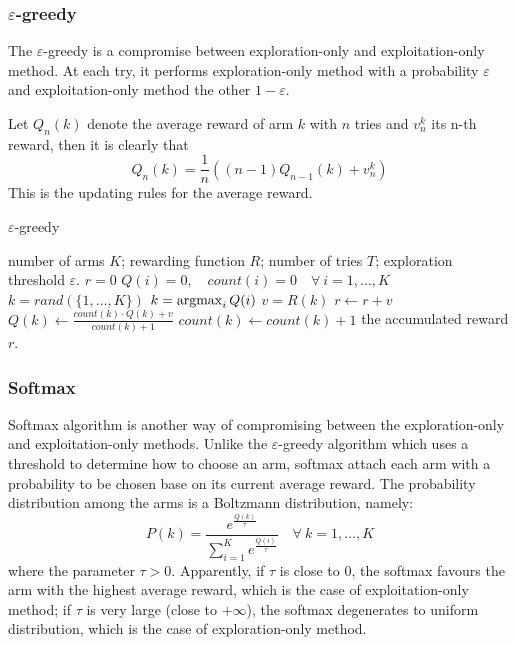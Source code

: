 \subsubsection{$\varepsilon$-greedy}
The $\varepsilon$-greedy is a compromise between exploration-only and exploitation-only method. At
each try, it performs exploration-only method with a probability $\varepsilon$ and exploitation-only method
the other $1 - \varepsilon$.\par
Let $Q_n(k)$ denote the average reward of arm $k$ with $n$ tries and $v_n^k$ its n-th reward, then it is 
clearly that
$$Q_n(k) = \frac{1}{n} ((n-1)Q_{n-1}(k) + v_n^k)$$
This is the updating rules for the average reward.

\begin{algorithm}
    \caption{$\varepsilon$-greedy}\label{epsilon_greedy_for_K_arm_bandit}
    \begin{algorithmic}[1]
        \Require number of arms $K$; rewarding function $R$; number of tries $T$; exploration threshold 
        $\varepsilon$.
        \State $r = 0$
        \State $Q(i) = 0, \quad count(i) = 0 \quad \forall~i=1,\ldots,K$
                \State $k = rand(\{1, \ldots, K\})$
            \Else
                \State $k = \operatorname*{argmax}_i Q(i)$
            \EndIf
            \State $v = R(k)$
            \State $r \gets r + v$
            \State $Q(k) \gets \frac{count(k) \cdot Q(k) + v}{count(k) + 1}$
            \State $count(k) \gets count(k) + 1$
        \EndFor
        \Ensure the accumulated reward $r$.
    \end{algorithmic}
\end{algorithm}


\subsubsection{Softmax}
Softmax algorithm is another way of compromising between the exploration-only and exploitation-only methods. 
Unlike the $\varepsilon$-greedy algorithm which uses a threshold to determine how to choose an arm, softmax 
attach each arm with a probability to be chosen base on its current average reward. The probability 
distribution among the arms is a Boltzmann distribution, namely:
\begin{equation}\label{K_arm_bandit_softmax}
P(k) = \frac{e^{\frac{Q(k)}{\tau}}}{\sum_{i=1}^K e^{\frac{Q(i)}{\tau}}}\quad\forall~k = 1,\ldots,K
\end{equation}
where the parameter $\tau > 0$. Apparently, if $\tau$ is close to $0$, the softmax favours the arm with
the highest average reward, which is the case of exploitation-only method; if $\tau$ is very large (close to 
$+\infty$), the softmax degenerates to uniform distribution, which is the case of exploration-only method.

